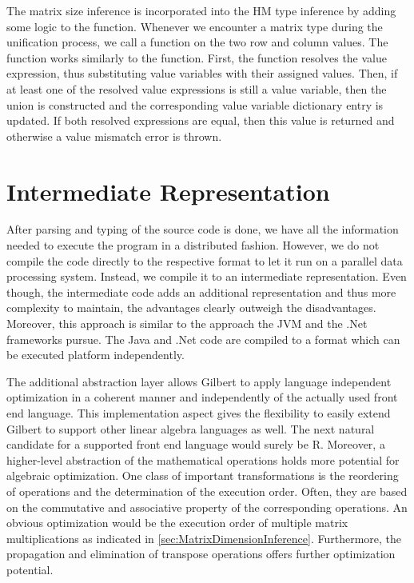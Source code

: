 The matrix size inference is incorporated into the HM type inference by adding some logic to the  function.
Whenever we encounter a matrix type during the unification process, we call a  function on the two row and column values.
The  function works similarly to the  function.
First, the function resolves the value expression, thus substituting value variables with their assigned values.
Then, if at least one of the resolved value expressions is still a value variable, then the union is constructed and the corresponding value variable dictionary entry is updated.
If both resolved expressions are equal, then this value is returned and otherwise a value mismatch error is thrown.

\section{Intermediate Representation}
\label{cha:intermediaterepresentation}

After parsing and typing of the source code is done, we have all the information needed to execute the program in a distributed fashion.
However, we do not compile the code directly to the respective format to let it run on a parallel data processing system.
Instead, we compile it to an intermediate representation.
Even though, the intermediate code adds an additional representation and thus more complexity to maintain, the advantages clearly outweigh the disadvantages.
Moreover, this approach is similar to the approach the JVM and the .Net frameworks pursue.
The Java and .Net code are compiled to a format which can be executed platform independently.

The additional abstraction layer allows Gilbert to apply language independent optimization in a coherent manner and independently of the actually used front end language.
This implementation aspect gives the flexibility to easily extend Gilbert to support other linear algebra languages as well.
The next natural candidate for a supported front end language would surely be R.
Moreover, a higher-level abstraction of the mathematical operations holds more potential for algebraic optimization.
One class of important transformations is the reordering of operations and the determination of the execution order.
Often, they are based on the commutative and associative property of the corresponding operations.
An obvious optimization would be the execution order of multiple matrix multiplications as indicated in \cref{sec:MatrixDimensionInference}.
Furthermore, the propagation and elimination of transpose operations offers further optimization potential.


